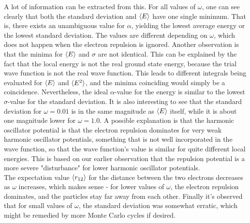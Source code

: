 \documentclass[10pt,a4paper]{article}
\begin{document}
A lot of information can be extracted from this. For all values of $\omega$, one can see clearly that both the standard deviation and $\braket{E}$ have one single minimum. That is, there exists an unambiguous value for $\alpha$, yielding the lowest average energy or the lowest standard deviation. The values are different depending on $\omega$, which does not happen when the electron repulsion is ignored. Another observation is that the minima for $\braket{E}$ and $\sigma$ are not identical. This can be explained by the fact that the local energy is not the real ground state energy, because the trial wave function is not the real wave function. This leads to different integrals being evaluated for $\braket{E}$ and $\braket{E^2}$, and the minima coinciding would simply be a coincidence. Nevertheless, the ideal $\alpha$-value for the energy is similar to the lowest $\sigma$-value for the standard deviation. It is also interesting to see that the standard deviation for $\omega=0.01$ is in the same magnitude as $\braket{E}$ itself, while it is about one magnitude lower for $\omega=1.0$. A possible explanation is that the harmonic oscillator potential is that the electron repulsion dominates for very weak harmonic oscillator potentials, something that is not well incorporated in the wave function, so that the wave function's value is similar for quite different local energies. This is based on our earlier observation that the repulsion potential is a more severe "disturbance" for lower harmonic oscillator potentials.\\
The expectation value $\braket{r_{12}}$ for the distance between the two electrons decreases as $\omega$ increases, which makes sense - for lower values of  $\omega$, the electron repulsion dominates, and the particles stay far away from each other. Finally it's observed that for small values of $\omega$, the standard deviation was somewhat erratic, which might be remedied by more Monte Carlo cycles if desired.
\end{document}
